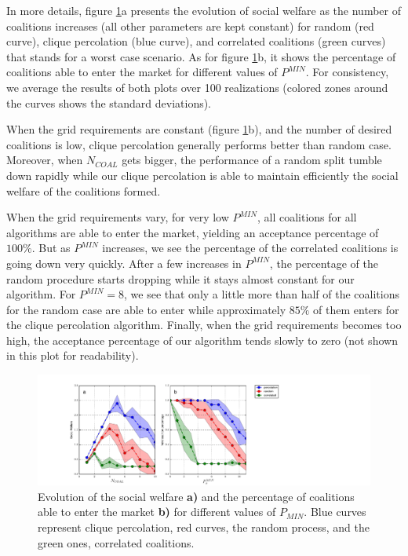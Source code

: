 \documentclass[conference]{IEEEtran}
\begin{document}
In more details, figure \ref{Fig4}a presents the evolution of social welfare as the number of coalitions increases (all other parameters are kept constant) for random (red curve), clique percolation (blue curve), and correlated coalitions (green curves) that stands for a worst case scenario. As for figure \ref{Fig4}b, it shows the percentage of coalitions able to enter the market for different values of $ P^{MIN} $. For consistency, we average the results of both plots over 100 realizations (colored zones around the curves shows the standard deviations).

When the grid requirements are constant (figure \ref{Fig4}b), and the number of desired coalitions is low, clique percolation generally performs better than random case. Moreover, when $ N_{COAL} $ gets bigger, the performance of a random split tumble down rapidly while our clique percolation is able to maintain efficiently the social welfare of the coalitions formed.

When the grid requirements vary, for very low $ P^{MIN} $, all coalitions for all algorithms are able to enter the market, yielding an acceptance percentage of $ 100 \% $. But as $ P^{MIN} $ increases, we see the percentage of the correlated coalitions is going down very quickly. After a few increases in $ P^{MIN} $, the percentage of the random procedure starts dropping while it stays almost constant for our algorithm. For $ P^{MIN} = 8 $, we see that only a little more than half of the coalitions for the random case are able to enter while approximately $ 85 \%$ of them enters for the clique percolation algorithm. Finally, when the grid requirements becomes too high, the acceptance percentage of our algorithm tends slowly to zero (not shown in this plot for readability).

\begin{figure}
 \centering
  \includegraphics[scale=0.35]{figure8/fig8.pdf}
  \caption{Evolution of the social welfare \textbf{a)} and the percentage of coalitions able to enter the market \textbf{b)} for different values of $ P_{MIN} $. Blue curves represent clique percolation, red curves, the random process, and the green ones, correlated coalitions.}
 \label{Fig4}
\end{figure}
\end{document}

